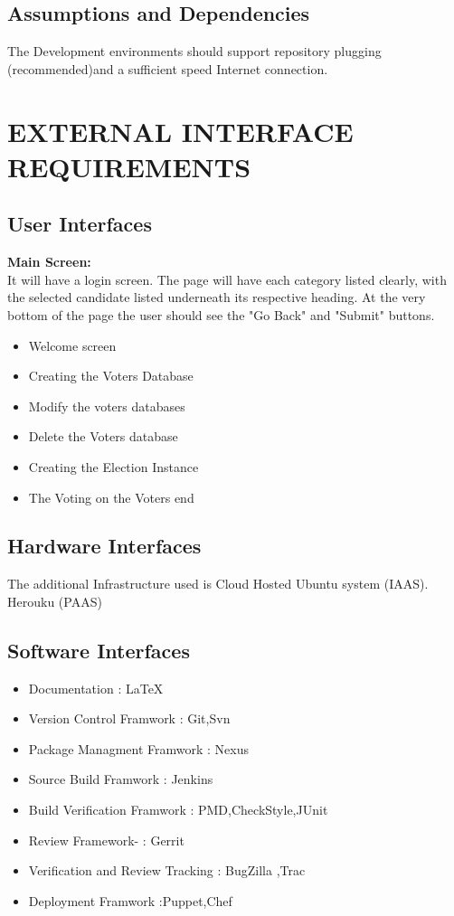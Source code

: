 \documentclass[12pt,a4paper,oneside]{report}
\begin{document}
 \section{Assumptions and Dependencies }
  
\par The Development environments should support repository plugging (recommended)and a sufficient speed Internet connection.
 


 \chapter{EXTERNAL INTERFACE REQUIREMENTS}
 \section{User Interfaces}
 \textbf{Main Screen:}\\
 It will have a login screen. The page will have each category listed clearly, with the selected candidate listed underneath its respective heading. At the very bottom of the page the user should see the "Go Back" and "Submit" buttons. 
 \begin{itemize}
 \item  Welcome screen 
 \item  Creating the Voters Database

\item  Modify the voters databases

\item  Delete the Voters database
\item  Creating the Election Instance
\item  The Voting on the Voters end



 \end{itemize}
 \section{Hardware Interfaces}

 The additional Infrastructure  used is Cloud Hosted Ubuntu system (IAAS). Herouku (PAAS)

\section{Software Interfaces}

\begin{itemize}

 
 \item Documentation : LaTeX
\item Version Control Framwork : Git,Svn
\item  Package Managment Framwork : Nexus
\item  Source Build Framwork : Jenkins
\item  Build Verification Framwork : PMD,CheckStyle,JUnit
\item Review Framework- : Gerrit
\item Verification and Review Tracking : BugZilla ,Trac
\item Deployment Framwork :Puppet,Chef 

\end{itemize}
\end{document}
